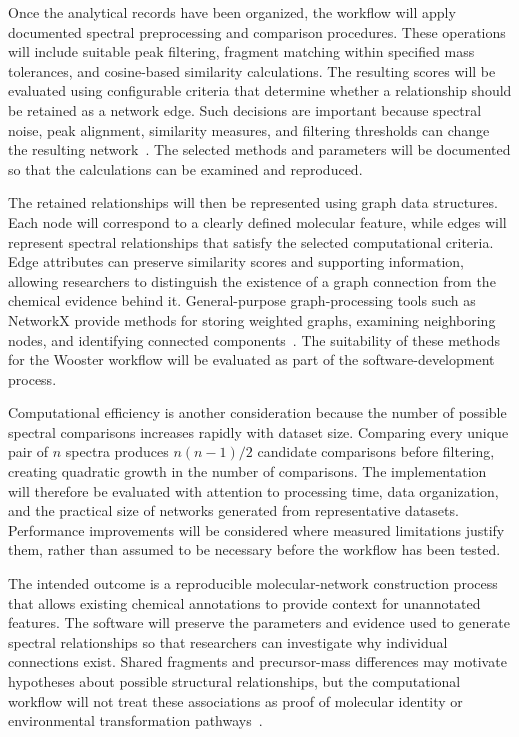         Once the analytical records have been organized, the workflow will apply documented spectral preprocessing and comparison procedures. These operations will include suitable peak filtering, fragment matching within specified mass tolerances, and cosine-based similarity calculations. The resulting scores will be evaluated using configurable criteria that determine whether a relationship should be retained as a network edge. Such decisions are important because spectral noise, peak alignment, similarity measures, and filtering thresholds can change the resulting network~\cite{Olivon2017,Bittremieux2022,DallaValle2025}. The selected methods and parameters will be documented so that the calculations can be examined and reproduced.

        The retained relationships will then be represented using graph data structures. Each node will correspond to a clearly defined molecular feature, while edges will represent spectral relationships that satisfy the selected computational criteria. Edge attributes can preserve similarity scores and supporting information, allowing researchers to distinguish the existence of a graph connection from the chemical evidence behind it. General-purpose graph-processing tools such as NetworkX provide methods for storing weighted graphs, examining neighboring nodes, and identifying connected components~\cite{Hagberg2008,Newman2003}. The suitability of these methods for the Wooster workflow will be evaluated as part of the software-development process.

        Computational efficiency is another consideration because the number of possible spectral comparisons increases rapidly with dataset size. Comparing every unique pair of $n$ spectra produces $n(n-1)/2$ candidate comparisons before filtering, creating quadratic growth in the number of comparisons. The implementation will therefore be evaluated with attention to processing time, data organization, and the practical size of networks generated from representative datasets. Performance improvements will be considered where measured limitations justify them, rather than assumed to be necessary before the workflow has been tested.

        The intended outcome is a reproducible molecular-network construction process that allows existing chemical annotations to provide context for unannotated features. The software will preserve the parameters and evidence used to generate spectral relationships so that researchers can investigate why individual connections exist. Shared fragments and precursor-mass differences may motivate hypotheses about possible structural relationships, but the computational workflow will not treat these associations as proof of molecular identity or environmental transformation pathways~\cite{Schymanski2014,Chao2025}.

